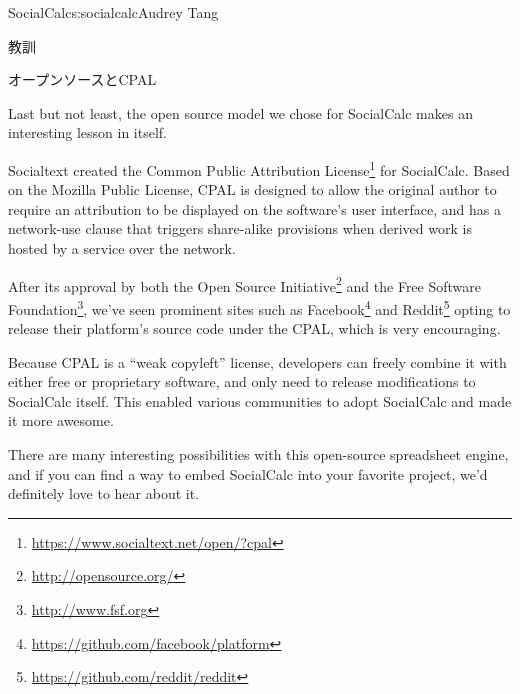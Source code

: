\begin{aosachapter}{SocialCalc}{s:socialcalc}{Audrey Tang}
\begin{aosasect1}{教訓}
\begin{aosasect2}{オープンソースとCPAL}

Last but not least, the open source model we chose for SocialCalc
makes an interesting lesson in itself.


Socialtext created the Common Public Attribution
License\footnote{\url{https://www.socialtext.net/open/?cpal}} for
SocialCalc.  Based on the Mozilla Public License, CPAL is designed to
allow the original author to require an attribution to be displayed
on the software's user interface, and has a network-use clause that
triggers share-alike provisions when derived work is hosted by a
service over the network.


After its approval by both the Open Source
Initiative\footnote{\url{http://opensource.org/}} and the Free
Software Foundation\footnote{\url{http://www.fsf.org}}, we've seen prominent
sites such as Facebook\footnote{\url{https://github.com/facebook/platform}}
and Reddit\footnote{\url{https://github.com/reddit/reddit}} opting to release
their platform's source code under the CPAL, which is very
encouraging.


Because CPAL is a ``weak copyleft'' license, developers can freely
combine it with either free or proprietary software, and only need to
release modifications to SocialCalc itself.  This enabled various
communities to adopt SocialCalc and made it more awesome.


There are many interesting possibilities with this open-source
spreadsheet engine, and if you can find a way to embed SocialCalc
into your favorite project, we'd definitely love to hear about it.

\end{aosasect2}

\end{aosasect1}

\end{aosachapter}
